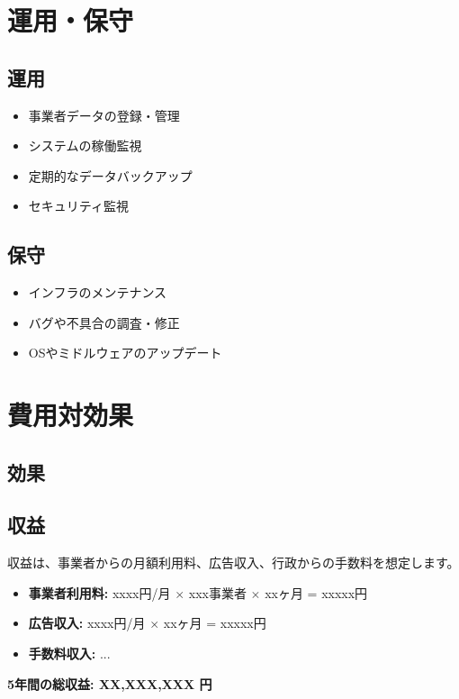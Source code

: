 \documentclass{docs}
\begin{document}
\section{運用・保守}
\subsection{運用}
\begin{itemize}
    \item 事業者データの登録・管理
    \item システムの稼働監視
    \item 定期的なデータバックアップ
    \item セキュリティ監視
\end{itemize}

\subsection{保守}
\begin{itemize}
    \item インフラのメンテナンス
    \item バグや不具合の調査・修正
    \item OSやミドルウェアのアップデート
\end{itemize}

\section{費用対効果}
\subsection{効果}


\subsection{収益}
収益は、事業者からの月額利用料、広告収入、行政からの手数料を想定します。
\begin{itemize}
    \item \textbf{事業者利用料:} xxxx円/月 $\times$ xxx事業者 $\times$ xxヶ月 = xxxxx円
    \item \textbf{広告収入:} xxxx円/月 $\times$ xxヶ月 = xxxxx円
    \item \textbf{手数料収入:} ...
\end{itemize}
\textbf{5年間の総収益: XX,XXX,XXX 円}
\end{document}
